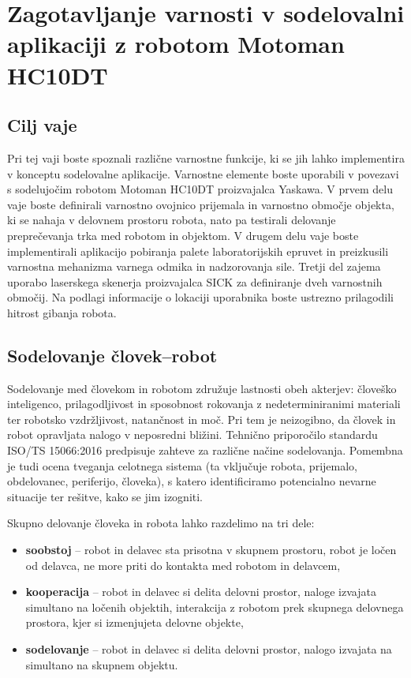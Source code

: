 \chapter{Zagotavljanje varnosti v sodelovalni aplikaciji z robotom Motoman HC10DT}%

\begin{mdframed}[backgroundcolor=green!20, shadow=true,roundcorner=8pt]
	\vspace{-0.35cm}
	
	\section{Cilj vaje}
	
	Pri tej vaji boste spoznali različne varnostne funkcije, ki se jih lahko implementira v konceptu sodelovalne aplikacije. Varnostne elemente boste uporabili v povezavi s sodelujočim robotom Motoman HC10DT proizvajalca Yaskawa. V prvem delu vaje boste definirali varnostno ovojnico prijemala in varnostno območje objekta, ki se nahaja v delovnem prostoru robota, nato pa testirali delovanje preprečevanja trka med robotom in objektom. V drugem delu vaje boste implementirali aplikacijo pobiranja palete laboratorijskih epruvet in preizkusili varnostna mehanizma varnega odmika in nadzorovanja sile. Tretji del zajema uporabo laserskega skenerja proizvajalca SICK za definiranje dveh varnostnih območij. Na podlagi informacije o lokaciji uporabnika boste ustrezno prilagodili hitrost gibanja robota.
	
\end{mdframed}

\section{Sodelovanje človek--robot}

Sodelovanje med človekom in robotom združuje lastnosti obeh akterjev: človeško inteligenco, prilagodljivost in sposobnost rokovanja z nedeterminiranimi materiali ter robotsko vzdržljivost, natančnost in moč. Pri tem je neizogibno, da človek in robot opravljata nalogo v neposredni bližini. Tehnično priporočilo standardu ISO/TS 15066:2016 predpisuje zahteve za različne načine sodelovanja. Pomembna je tudi ocena tveganja celotnega sistema (ta vključuje robota, prijemalo, obdelovanec, periferijo, človeka), s katero identificiramo potencialno nevarne situacije ter rešitve, kako se jim izogniti.

Skupno delovanje človeka in robota lahko razdelimo na tri dele:
\begin{itemize}
	\item \textbf{soobstoj} -- robot in delavec sta prisotna v skupnem prostoru, robot je ločen od delavca, ne more priti do kontakta med robotom in delavcem,
	\item \textbf{kooperacija} -- robot in delavec si delita delovni prostor, naloge izvajata simultano na ločenih objektih, interakcija z robotom prek skupnega delovnega prostora, kjer si izmenjujeta delovne objekte,
	\item  \textbf{sodelovanje} -- robot in delavec si delita delovni prostor, nalogo izvajata na simultano na skupnem objektu.
\end{itemize}


